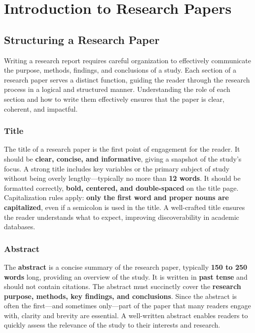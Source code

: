 \documentclass[
]{book}
\begin{document}
\chapter{Introduction to Research Papers}\label{introduction-to-research-papers}

\section{Structuring a Research Paper}\label{structuring-a-research-paper}

Writing a research report requires careful organization to effectively communicate the purpose, methods, findings, and conclusions of a study. Each section of a research paper serves a distinct function, guiding the reader through the research process in a logical and structured manner. Understanding the role of each section and how to write them effectively ensures that the paper is clear, coherent, and impactful.

\subsection*{Title}\label{title}

The title of a research paper is the first point of engagement for the reader. It should be \textbf{clear, concise, and informative}, giving a snapshot of the study's focus. A strong title includes key variables or the primary subject of study without being overly lengthy---typically no more than \textbf{12 words}. It should be formatted correctly, \textbf{bold, centered, and double-spaced} on the title page. Capitalization rules apply: \textbf{only the first word and proper nouns are capitalized}, even if a semicolon is used in the title. A well-crafted title ensures the reader understands what to expect, improving discoverability in academic databases.

\subsection*{Abstract}\label{abstract}

The \textbf{abstract} is a concise summary of the research paper, typically \textbf{150 to 250 words} long, providing an overview of the study. It is written in \textbf{past tense} and should not contain citations. The abstract must succinctly cover the \textbf{research purpose, methods, key findings, and conclusions}. Since the abstract is often the first---and sometimes only---part of the paper that many readers engage with, clarity and brevity are essential. A well-written abstract enables readers to quickly assess the relevance of the study to their interests and research.
\end{document}
